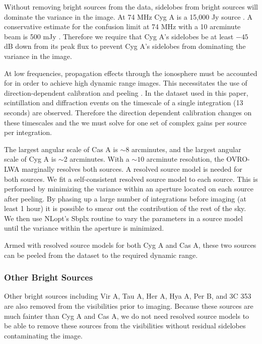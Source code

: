 \documentclass[twocolumn]{aastex61}
\newcommand{\todo}[1]{\textcolor{red}{TODO: #1}\PackageWarning{TODO:}{#1!}}
\begin{document}
Without removing bright sources from the data, sidelobes from bright sources will dominate the
variance in the image.  At 74 MHz Cyg A is a 15,000 Jy source \citep{1977A&A....61...99B}. A
conservative estimate for the confusion limit at 74 MHz with a 10 arcminute beam is 500 mJy
\citep{2012RaSc...47.0K04L}. Therefore we require that Cyg A's sidelobes be at least $-45$ dB down
from its peak flux to prevent Cyg A's sidelobes from dominating the variance in the image.

At low frequencies, propagation effects through the ionosphere must be accounted for in order to
achieve high dynamic range images. This necessitates the use of direction-dependent calibration and
peeling \citep{2008ISTSP...2..707M, 2015MNRAS.449.2668S}.  In the dataset used in this paper,
scintillation and diffraction events on the timescale of a single integration (13 seconds) are
observed. Therefore the direction dependent calibration changes on these timescales and the we must
solve for one set of complex gains per source per integration.

The largest angular scale of Cas A is $\sim$8 arcminutes, and the largest angular scale of Cyg A is
$\sim$2 arcminutes. With a $\sim10$ arcminute resolution, the OVRO-LWA marginally resolves both
sources. A resolved source model is needed for both sources. We fit a self-consistent resolved
source model to each source. This is performed by minimizing the variance within an aperture located
on each source after peeling. By phasing up a large number of integrations before imaging (at least
1 hour) it is possible to smear out the contribution of the rest of the sky.  We then use NLopt's
Sbplx routine \citep{nlopt, sbplx} to vary the parameters in a source model until the variance
within the aperture is minimized.

Armed with resolved source models for both Cyg A and Cas A, these two sources can be peeled from the
dataset to the required dynamic range.


\subsubsection{Other Bright Sources}

Other bright sources including Vir A, Tau A, Her A, Hya A, Per B, and 3C 353 are also removed from
the visibilities prior to imaging. Because these sources are much fainter than Cyg A and Cas A, we
do not need resolved source models to be able to remove these sources from the visibilities without
residual sidelobes contaminating the image.
\end{document}
